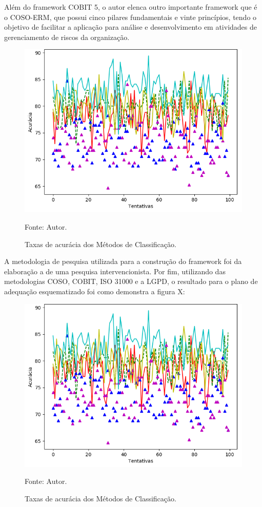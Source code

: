 \documentclass[
	12pt,				%
	openright,			%
	oneside,			%
	a4paper,			%
	english,			%
	french,				%
	spanish,			%
	brazil,				%
	]{abntex2}
\begin{document}
Além do framework COBIT 5, o autor elenca outro importante framework que é o COSO-ERM, que possui cinco pilares fundamentais e vinte princípios, tendo o objetivo de facilitar a aplicação para análise e desenvolvimento em atividades de gerenciamento de riscos da organização.

\begin{figure}[ht]
    \centering
    \caption{Taxas de acurácia dos Métodos de Classificação.}
    \includegraphics[width=5.0in]{Images/acc-classification.png}
    \label{fig: grafico-acc}
    
    \centering \small Fonte: Autor.
\end{figure}


A metodologia de pesquisa utilizada para a construção do framework foi da elaboração a de uma pesquisa intervencionista. Por fim, utilizando das metodologias COSO, COBIT, ISO 31000 e a LGPD, o resultado para o plano de adequação esquematizado foi como demonstra a figura X: 


\begin{figure}[ht]
    \centering
    \caption{Taxas de acurácia dos Métodos de Classificação.}
    \includegraphics[width=5.0in]{Images/acc-classification.png}
    \label{fig: grafico-acc}
    
    \centering \small Fonte: Autor.
\end{figure}
\end{document}
